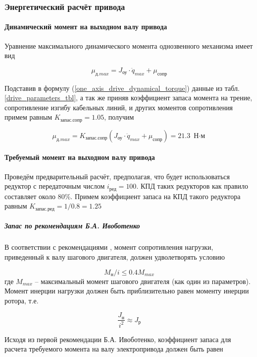 \subsubsection{Энергетический расчёт привода}
\paragraph{Динамический момент на выходном валу привода}

Уравнение максимального динамического момента однозвенного механизма имеет вид

\begin{equation}
    \mu_\textit{д.max} = J_\textit{оу} \cdot \ddot{q}_{max} + \mu_\textit{сопр}
    \label{one_axis_drive_dynamical_torque}
\end{equation}

Подставив в формулу (\ref{one_axis_drive_dynamical_torque}) данные из табл.
\ref{drive_parameters_tbl}, а так же приняв коэффициент запаса момента на трение,
сопротивление изгибу кабельных линий, и других моментов сопротивления примем
равным $K_\textit{запас.сопр} = 1.05$, получим

$$
    \mu_\textit{д.max} = K_\textit{запас.сопр} (J_\textit{оу} \cdot \ddot{q}_{max}
                        + \mu_\textit{сопр}) = 21.3 \text{ Н$\cdot$м}
$$

\paragraph{Требуемый момент на выходном валу привода}

Проведём предварительный расчёт, предполагая, что будет использоваться редуктор
с передаточным числом $i_\textit{ред} = 100$. КПД таких редукторов как правило
составляет около 80\%. Примем коэффициент запаса на КПД такого редуктора равным
$K_\textit{запас.ред} = 1 / 0.8 = 1.25$

\subparagraph{Запас по рекомендациям Б.А. Ивоботенко}
В соответствии с рекомендациями \cite{IvobotenkoKazachenko}, момент сопротивления
нагрузки, приведенный к валу шагового двигателя, должен удволетворять условию

$$
    M_\textit{н}/i \leq 0.4 M_{max}
$$
где $M_{max}$ – максимальный момент шагового двигателя (как один из параметров).
Момент инерции нагрузки должен быть приблизительно равен моменту инерции ротора,
т.е.

$$
    \frac{J_\textit{н}}{i^2} \approx J_\textit{р}
$$

Исходя из первой рекомендации Б.А. Ивоботенко, коэффициент запаса для расчета
требуемого момента на валу электропривода должен быть равен

